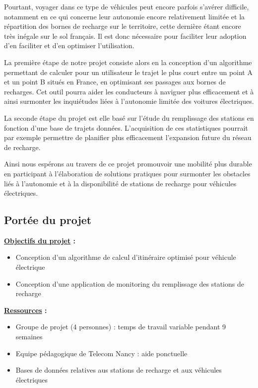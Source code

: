 \documentclass[a4paper, 12pt]{report}
\begin{document}
Pourtant, voyager dans ce type de véhicules peut encore parfois s'avérer difficile, notamment en ce qui concerne leur autonomie encore relativement limitée et la répartition des bornes de recharge sur le territoire, cette dernière étant encore très inégale sur le sol français. Il est donc nécessaire pour faciliter leur adoption d'en faciliter et d'en optimiser l'utilisation.
\bigskip

La première étape de notre projet consiste alors en la conception d'un algorithme permettant de calculer pour un utilisateur le trajet le plus court entre un point A et un point B situés en France, en optimisant ses passages aux bornes de recharges. Cet outil pourra aider les conducteurs à naviguer plus efficacement et à ainsi surmonter les inquiétudes liées à l'autonomie limitée des voitures électriques.
\bigskip

La seconde étape du projet est elle basé sur l'étude du remplissage des stations en fonction d'une base de trajets données. L'acquisition de ces statistiques pourrait par exemple permettre de planifier plus efficacement l'expansion future du réseau de recharge.
\bigskip

Ainsi nous espérons au travers de ce projet promouvoir une mobilité plus durable en participant à l'élaboration de solutions pratiques pour surmonter les obstacles liés à l'autonomie et à la disponibilité de stations de recharge pour véhicules électriques.
\bigskip

\subsection{Portée du projet}

\textbf{\underline{Objectifs du projet} :}
\begin{itemize}
    \item Conception d'un algorithme de calcul d'itinéraire optimisé pour véhicule électrique
    \item Conception d'une application de monitoring du remplissage des stations de recharge
\end{itemize}
\bigskip

\textbf{\underline{Ressources} :}
\begin{itemize}
    \item Groupe de projet (4 personnes) : temps de travail variable pendant 9 semaines
    \item Equipe pédagogique de Telecom Nancy : aide ponctuelle
    \item Bases de données relatives aus stations de recharge et aux véhicules électriques
\end{itemize}
\clearpage
\end{document}
